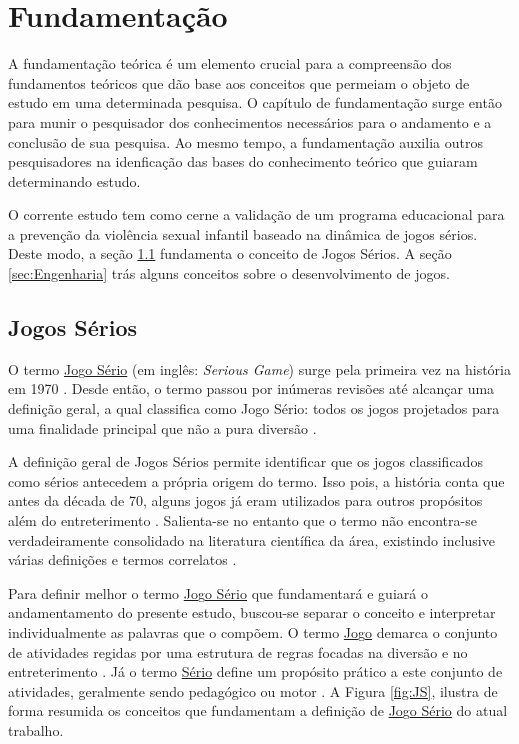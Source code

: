 \chapter{Fundamentação}\label{ch:Fundamentacao}

A fundamentação teórica é um elemento crucial para a compreensão dos fundamentos teóricos que dão base aos conceitos que permeiam o objeto de estudo em uma determinada pesquisa. O capítulo de fundamentação surge então para munir o pesquisador dos conhecimentos necessários para o andamento e a conclusão de sua pesquisa. Ao mesmo tempo, a fundamentação auxilia outros pesquisadores na idenficação das bases do conhecimento teórico que guiaram determinando estudo. 

O corrente estudo tem como cerne a validação de um programa educacional para a prevenção da violência sexual infantil baseado na dinâmica de jogos sérios. Deste modo, a seção \ref{sec:JogosSerios} fundamenta o conceito de Jogos Sérios. A seção \ref{sec:Engenharia} trás alguns conceitos sobre o desenvolvimento de jogos. %

\vspace{0.75cm}

\section{Jogos Sérios}\label{sec:JogosSerios}

O termo \underline{Jo}g\underline{o Sério} (em inglês: \textit{Serious Game}) surge pela primeira vez na história em 1970 \cite{clark1970serious}. Desde então, o termo passou por inúmeras revisões até alcançar uma definição geral, a qual classifica como Jogo Sério: todos os jogos projetados para uma finalidade principal que não a pura diversão \cite{michael2005serious, de2015aprendizagem, laamarti2014overview}.

A definição geral de Jogos Sérios permite identificar que os jogos classificados como sérios antecedem a própria origem do termo. Isso pois, a história conta que antes da década de 70, alguns jogos já eram utilizados para outros propósitos além do entreterimento \cite{wilkinson2016brief}. Salienta-se no entanto que o termo não encontra-se verdadeiramente consolidado na literatura científica da área, existindo inclusive várias definições e termos correlatos \cite{pourabdollahian2012serious}.

Para definir melhor o termo \underline{Jo}g\underline{o Sério} que fundamentará e guiará o andamentamento do presente estudo, buscou-se separar o conceito e interpretar individualmente as palavras que o compõem. O termo \underline{Jo}g\underline{o} demarca o conjunto de atividades regidas por uma estrutura de regras focadas na diversão e no entreterimento \cite{kishimoto1994jogo}. Já o termo \underline{Sério} define um propósito prático a este conjunto de atividades, geralmente sendo pedagógico ou motor \cite{schroeder2017wobu, baptista2017jogos}. %
A Figura \ref{fig:JS}, ilustra de forma resumida os conceitos que fundamentam a definição de \underline{Jo}g\underline{o Sério} do atual trabalho.  

